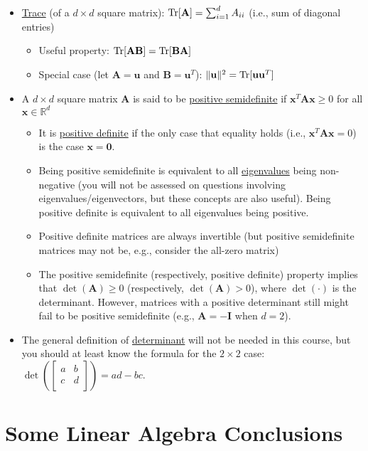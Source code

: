 \documentclass[11pt]{article}
\newcommand{\xv}{\mathbf{x}}
\newcommand{\uv}{\mathbf{u}}
\newcommand{\Av}{\mathbf{A}}
\newcommand{\Bv}{\mathbf{B}}
\newcommand{\Iv}{\mathbf{I}}
\begin{document}
\begin{itemize}
	\item \underline{Trace} (of a $d \times d$ square matrix): ${\rm Tr}[\Av] = \sum_{i=1}^d A_{ii}$ (i.e., sum of diagonal entries)
	\begin{itemize}
		\item Useful property: ${\rm Tr}[\Av\Bv] = {\rm Tr}[\Bv\Av]$
		\item Special case (let $\Av = \uv$ and $\Bv = \uv^T$): $\|\uv\|^2 = {\rm Tr}[\uv\uv^T]$
	\end{itemize}
	\item A $d \times d$ square matrix $\Av$ is said to be \underline{positive semidefinite} if $\xv^T \Av \xv \ge 0$ for all $\xv \in \mathbb{R}^d$
	\begin{itemize}
		\item It is \underline{positive definite} if the only case that equality holds (i.e., $\xv^T \Av \xv = 0$) is the case $\xv = \boldsymbol{0}$.
		\item Being positive semidefinite is equivalent to all \underline{eigenvalues} being non-negative (you will not be assessed on questions involving eigenvalues/eigenvectors, but these concepts are also useful).
		Being positive definite is equivalent to all eigenvalues being positive.
		\item Positive definite matrices are always invertible (but positive semidefinite matrices may not be, e.g., consider the all-zero matrix)
		\item The positive semidefinite (respectively, positive definite) property implies that $\det(\Av) \ge 0$ (respectively, $\det(\Av) > 0$), where $\det(\cdot)$ is the determinant.  However, matrices with a positive determinant still might fail to be positive semidefinite (e.g., $\Av = -\Iv$ when $d=2$).
	\end{itemize}
	\item The general definition of \underline{determinant} will not be needed in this course, but you should at least know the formula for the $2 \times 2$ case: $\det\left( \left[ \begin{array}{cc}
		a & b\\
		c & d \\
	\end{array} \right]  \right) = ad - bc$.
\end{itemize}


\section{Some Linear Algebra Conclusions}
\end{document}
